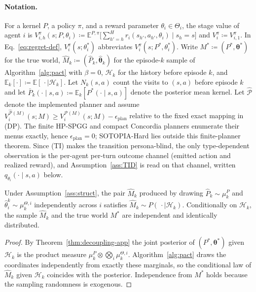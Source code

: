 \paragraph{Notation.} For a kernel $P$, a policy $\pi$, and a reward parameter $\theta_i \in \Theta_i$, the stage value of agent $i$ is $V_{i,h}^{\pi}(s; P, \theta_i) \coloneqq \mathbb{E}^{P,\pi}\big[\sum_{h'=h}^{H} r_i(s_{h'}, a_{h'}, \theta_i) \mid s_h = s\big]$ and $V_i^{\pi} \coloneqq V_{i,1}^{\pi}$. In Eq.~\eqref{eq:regret-def}, $V_i^{\pi}(s;\theta_i^*)$ abbreviates $V_i^{\pi}(s; P^*, \theta_i^*)$. Write $M^* \coloneqq (P^*, \boldsymbol\theta^*)$ for the true world, $\hat M_k \coloneqq (\hat P_k, \hat{\boldsymbol\theta}_k)$ for the episode-$k$ sample of Algorithm~\ref{alg:pact} with $\beta=0$, $\mathcal H_k$ for the history before episode $k$, and $\mathbb{E}_k[\cdot] \coloneqq \mathbb{E}[\,\cdot \mid \mathcal H_k]$. Let $N_k(s,a)$ count the visits to $(s,a)$ before episode $k$ and let $\bar P_k(\cdot \mid s,a) \coloneqq \mathbb{E}_k[P^*(\cdot\mid s,a)]$ denote the posterior mean kernel. Let $\widehat{\mathcal P}$ denote the implemented planner and assume $V_i^{\widehat{\mathcal P}(M)}(s;M) \ge V_i^{\mathcal P(M)}(s;M)-\epsilon_{\mathrm{plan}}$ relative to the fixed exact mapping in (DP). The finite HP-SPGG and compact Concordia planners enumerate their menus exactly, hence $\epsilon_{\mathrm{plan}}=0$; SOTOPIA-Hard lies outside this finite-planner theorem. Since (TI) makes the transition persona-blind, the only type-dependent observation is the per-agent per-turn outcome channel (emitted action and realized reward), and Assumption~\ref{ass:TID} is read on that channel, written $q_{\theta_i}(\cdot\mid s,a)$ below.

\begin{lemma}
\label{lem:exact-sampling}
Under Assumption~\ref{ass:struct}, the pair $\hat M_k$ produced by drawing $\hat P_k \sim \mu_k^P$ and $\hat\theta_i^k \sim \mu_k^{\Theta,i}$ independently across $i$ satisfies $\hat M_k \sim P(\,\cdot \mid \mathcal H_k)$. Conditionally on $\mathcal H_k$, the sample $\hat M_k$ and the true world $M^*$ are independent and identically distributed.
\end{lemma}

\begin{proof}
By Theorem~\ref{thm:decoupling-app} the joint posterior of $(P^*, \boldsymbol\theta^*)$ given $\mathcal H_k$ is the product measure $\mu_k^P \otimes \bigotimes_i \mu_k^{\Theta,i}$. Algorithm~\ref{alg:pact} draws the coordinates independently from exactly these marginals, so the conditional law of $\hat M_k$ given $\mathcal H_k$ coincides with the posterior. Independence from $M^*$ holds because the sampling randomness is exogenous.
\end{proof}

